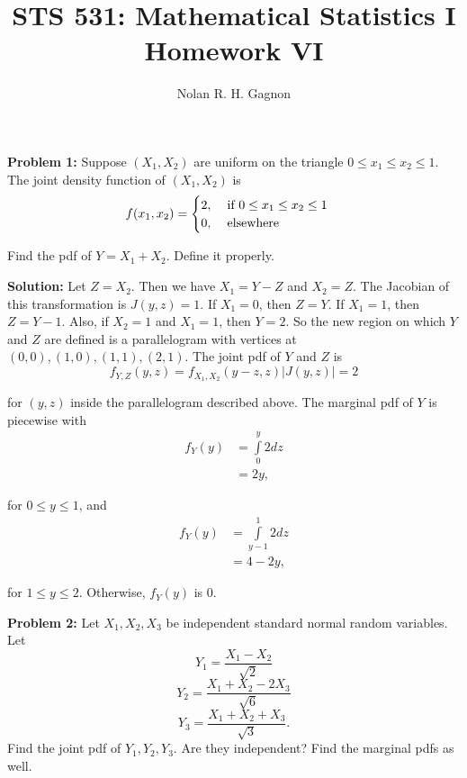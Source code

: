 \documentclass{article}
\title{STS 531:  Mathematical Statistics I \\
	   \textbf{Homework VI}}
\author{Nolan R. H. Gagnon}
\newcommand{\mybox}{%
    \collectbox{%
        \setlength{\fboxsep}{1pt}%
        \fbox{\BOXCONTENT}%
    }%
}
\begin{document}
\maketitle
\noindent\mybox{\textbf{Problem 1:}}  Suppose $(X_1, X_2)$ are uniform on the triangle $0\leq x_1 \leq x_2 \leq 1$.  The joint density function of $(X_1, X_2)$ is 
$$
f(x_1,x_2) = 
\begin{cases}
2, \hspace{4mm} \text{if  } 0\leq x_1 \leq x_2 \leq 1 \\
0, \hspace{4mm} \text{elsewhere}
\end{cases}
$$

\noindent Find the pdf of $Y=X_1 + X_2$.  Define it properly.

\vspace{5mm}

\noindent\mybox{\textbf{Solution:}}  Let $Z = X_2$.  Then we have $X_1 = Y - Z$ and $X_2 = Z$.  The Jacobian of this transformation is $J(y,z) = 1$.  If $X_1 = 0$, then $Z=Y$.  If $X_1 = 1$, then $Z = Y - 1$.  Also, if $X_2 = 1$ and $X_1 = 1$, then $Y = 2$.  So the new region on which $Y$ and $Z$ are defined is a parallelogram with vertices at $(0,0), (1,0), (1,1), (2,1)$.  The joint pdf of $Y$ and $Z$ is 
$$
f_{Y,Z}(y,z) = f_{X_1,X_2}(y-z,z)|J(y,z)| = 2
$$

\noindent for $(y,z)$ inside the parallelogram described above.  The marginal pdf of $Y$ is piecewise with
\begin{align*}
f_Y(y) &= \int\limits_0^y 2 dz \\
&= 2y,
\end{align*}

\noindent for $0\leq y \leq 1$, and
\begin{align*}
f_Y(y) &= \int\limits_{y-1}^1 2 dz \\
&= 4-2y,
\end{align*}

\noindent for $1\leq y \leq 2$.  Otherwise, $f_Y(y)$ is $0$.    
\pagebreak

\noindent\mybox{\textbf{Problem 2:}}  Let $X_1, X_2, X_3$ be independent standard normal random variables.  Let $$Y_1 = \frac{X_1-X_2}{\sqrt{2}}$$ $$Y_2 = \frac{X_1 + X_2 -2X_3}{\sqrt{6}}$$ $$Y_3 = \frac{X_1+X_2+X_3}{\sqrt{3}}.$$  Find the joint pdf of $Y_1, Y_2, Y_3$.  Are they independent?  Find the marginal pdfs as well.

\vspace{5mm}
\end{document}
